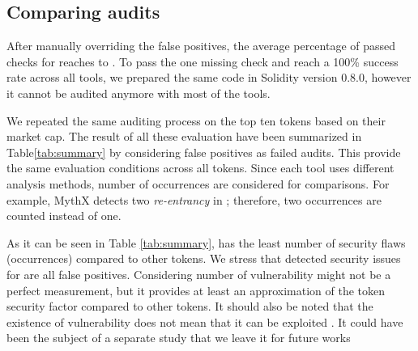 
\subsection{Comparing audits}
After manually overriding the false positives, the average percentage of passed checks for \sys reaches to \prct. To pass the one missing check and reach a 100\% success rate across all tools, we prepared the same code in Solidity version 0.8.0, however it cannot be audited anymore with most of the tools. 

We repeated the same auditing process on the top ten tokens based on their market cap\cite{EtherScan}. The result of all these evaluation have been summarized in Table\ref{tab:summary} by considering false positives as failed audits. This provide the same evaluation conditions across all tokens. Since each tool uses different analysis methods, number of occurrences are considered for comparisons. For example, MythX detects two \textit{re-entrancy} in \sys; therefore, two occurrences are counted instead of one. 

As it can be seen in Table \ref{tab:summary}, \sys has the least number of security flaws (occurrences) compared to other tokens. We stress that detected security issues for \sys are all false positives. {\blue Considering number of vulnerability might not be a perfect measurement, but it provides at least an approximation of the token security factor compared to other tokens. It should also be noted that the existence of vulnerability does not mean that it can be exploited \cite{VulExp}. It could have been the subject of a separate study that we leave it for future works}



